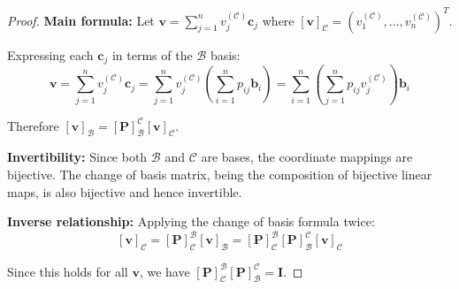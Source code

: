 \documentclass[12pt]{article}
\numberwithin{equation}{section}
\newcommand{\vect}[1]{\boldsymbol{#1}}   %
\newcommand{\mat}[1]{\mathbf{#1}}        %
\theoremstyle{plain}
\theoremstyle{definition}
\theoremstyle{remark}
\begin{document}
\begin{proof}
\textbf{Main formula:} Let $\vect{v} = \sum_{j=1}^n v_j^{(\mathcal{C})} \vect{c}_j$ where $[\vect{v}]_{\mathcal{C}} = (v_1^{(\mathcal{C})}, \ldots, v_n^{(\mathcal{C})})^T$.

Expressing each $\vect{c}_j$ in terms of the $\mathcal{B}$ basis:
$$\vect{v} = \sum_{j=1}^n v_j^{(\mathcal{C})} \vect{c}_j = \sum_{j=1}^n v_j^{(\mathcal{C})} \left(\sum_{i=1}^n p_{ij} \vect{b}_i\right) = \sum_{i=1}^n \left(\sum_{j=1}^n p_{ij} v_j^{(\mathcal{C})}\right) \vect{b}_i$$

Therefore $[\vect{v}]_{\mathcal{B}} = [\mat{P}]_{\mathcal{B}}^{\mathcal{C}} [\vect{v}]_{\mathcal{C}}$.

\textbf{Invertibility:} Since both $\mathcal{B}$ and $\mathcal{C}$ are bases, the coordinate mappings are bijective. The change of basis matrix, being the composition of bijective linear maps, is also bijective and hence invertible.

\textbf{Inverse relationship:} Applying the change of basis formula twice:
$$[\vect{v}]_{\mathcal{C}} = [\mat{P}]_{\mathcal{C}}^{\mathcal{B}} [\vect{v}]_{\mathcal{B}} = [\mat{P}]_{\mathcal{C}}^{\mathcal{B}} [\mat{P}]_{\mathcal{B}}^{\mathcal{C}} [\vect{v}]_{\mathcal{C}}$$

Since this holds for all $\vect{v}$, we have $[\mat{P}]_{\mathcal{C}}^{\mathcal{B}} [\mat{P}]_{\mathcal{B}}^{\mathcal{C}} = \mat{I}$.
\end{proof}
\end{document}
